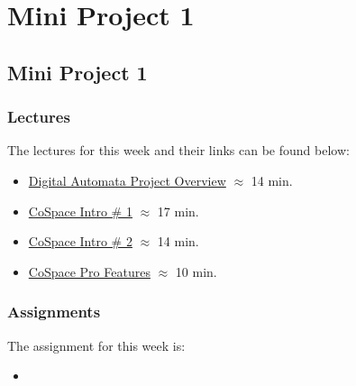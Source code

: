 \clearpage

\renewcommand{\ChapTitle}{Mini Project 1}
\renewcommand{\SectionTitle}{Mini Project 1}

\chapter{\ChapTitle}
\section{\SectionTitle}

\subsection{Lectures}

The lectures for this week and their links can be found below:

\begin{itemize}
    \item \href{https://applied.cs.colorado.edu/mod/hvp/view.php?id=49340}{Digital Automata Project Overview} $\approx$ 14 min.
    \item \href{https://applied.cs.colorado.edu/mod/hvp/view.php?id=49341}{CoSpace Intro \# 1} $\approx$ 17 min.
    \item \href{https://applied.cs.colorado.edu/mod/hvp/view.php?id=49342}{CoSpace Intro \# 2} $\approx$ 14 min.
    \item \href{https://applied.cs.colorado.edu/mod/hvp/view.php?id=49343}{CoSpace Pro Features} $\approx$ 10 min.
\end{itemize}

\subsection{Assignments}

The assignment for this week is:

\begin{itemize}
    \item {}
\end{itemize}